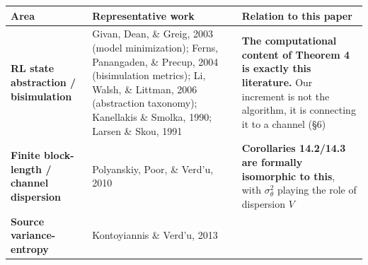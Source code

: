 \documentclass[11pt]{article}
\begin{document}
\begin{longtable}[]{@{}lll@{}}
\toprule
\begin{minipage}[b]{0.30\columnwidth}\raggedright
Area\strut
\end{minipage} & \begin{minipage}[b]{0.30\columnwidth}\raggedright
Representative work\strut
\end{minipage} & \begin{minipage}[b]{0.30\columnwidth}\raggedright
Relation to this paper\strut
\end{minipage}\tabularnewline
\midrule
\endhead
\begin{minipage}[t]{0.30\columnwidth}\raggedright
\textbf{RL state abstraction / bisimulation}\strut
\end{minipage} & \begin{minipage}[t]{0.30\columnwidth}\raggedright
Givan, Dean, \& Greig, 2003 (model minimization); Ferns, Panangaden, \& Precup, 2004 (bisimulation metrics); Li, Walsh, \& Littman, 2006 (abstraction taxonomy); Kanellakis \& Smolka, 1990; Larsen \& Skou, 1991\strut
\end{minipage} & \begin{minipage}[t]{0.30\columnwidth}\raggedright
\textbf{The computational content of Theorem 4 is exactly this literature.} Our increment is not the algorithm, it is connecting it to a channel (\S{}6)\strut
\end{minipage}\tabularnewline
\begin{minipage}[t]{0.30\columnwidth}\raggedright
\textbf{Finite block-length / channel dispersion}\strut
\end{minipage} & \begin{minipage}[t]{0.30\columnwidth}\raggedright
Polyanskiy, Poor, \& Verd'u, 2010\strut
\end{minipage} & \begin{minipage}[t]{0.30\columnwidth}\raggedright
\textbf{Corollaries 14.2/14.3 are formally isomorphic to this}, with \(\sigma_\theta^2\) playing the role of dispersion \(V\)\strut
\end{minipage}\tabularnewline
\begin{minipage}[t]{0.30\columnwidth}\raggedright
\textbf{Source variance-entropy}\strut
\end{minipage} & \begin{minipage}[t]{0.30\columnwidth}\raggedright
Kontoyiannis \& Verd'u, 2013\strut
\end{minipage} & \begin{minipage}[t]{0.30\columnwidth}\raggedright

\end{minipage}
\end{longtable}
\end{document}
